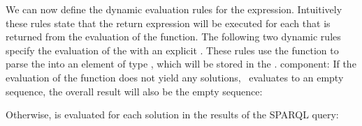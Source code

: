 We can now define the dynamic evaluation rules for the \SparqlForClause expression.  Intuitively these rules state that
the return expression  will be executed for each  that is returned from
the evaluation of the  function. The following two dynamic rules specify the evaluation of the
\SparqlForClause with an explicit \DatasetClause.  These rules use the  function to parse the
\DatasetClause into an element of type , which will be stored in the \dyn.
component: If the evaluation of the  function does not yield any solutions, \ie~evaluates to an
empty sequence, the overall result will also be the empty sequence:
%
\begin{dynamicrule}
  \singleLine
  \label{dyn:empty-sparqlfor}
\end{dynamicrule}%
%
Otherwise,  is evaluated for each solution in the results of the SPARQL query:
%
